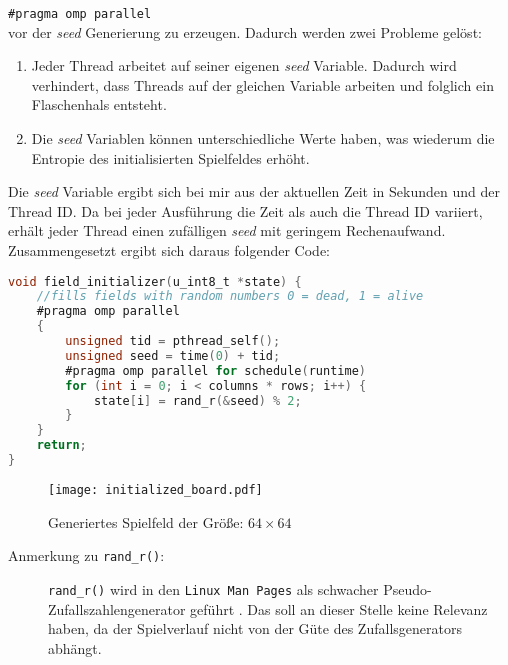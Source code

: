 \documentclass[german,plainarticle,hyperref,utf8]{zihpub}
\begin{document}
	\texttt{\#pragma omp parallel}\\
	
	vor der \textit{seed} Generierung zu erzeugen. Dadurch werden zwei Probleme gelöst:
	\begin{enumerate}
		\item Jeder Thread arbeitet auf seiner eigenen \textit{seed} Variable. Dadurch wird verhindert, dass Threads auf der gleichen Variable arbeiten und folglich ein Flaschenhals entsteht.
		\item Die \textit{seed} Variablen können unterschiedliche Werte haben, was wiederum die Entropie des initialisierten Spielfeldes erhöht.
	\end{enumerate}
	
	Die \textit{seed} Variable ergibt sich bei mir aus der aktuellen Zeit in Sekunden und der Thread ID. Da bei jeder Ausführung die Zeit als auch die Thread ID variiert, erhält jeder Thread einen zufälligen \textit{seed} mit geringem Rechenaufwand.\\
	
	Zusammengesetzt ergibt sich daraus folgender Code:\\
	
	\begin{lstlisting}[language=C, caption=Daten Initialisierung]
void field_initializer(u_int8_t *state) {
	//fills fields with random numbers 0 = dead, 1 = alive
	#pragma omp parallel
	{
		unsigned tid = pthread_self();
		unsigned seed = time(0) + tid;
		#pragma omp parallel for schedule(runtime)
		for (int i = 0; i < columns * rows; i++) {
			state[i] = rand_r(&seed) % 2;
		}
	}
	return;
}\end{lstlisting}
	\begin{figure}[h]
		\begin{center}
			\texttt{[image: initialized\_board.pdf]}
		\end{center}
		\caption{Generiertes Spielfeld der Größe: $64\times 64$}
	\end{figure}
	\newpage
	\begin{description}
		\item[Anmerkung zu \texttt{rand\_r()}:] \texttt{rand\_r()} wird in den \texttt{Linux Man Pages} als schwacher Pseudo-Zufallszahlengenerator geführt \cite{lmp}. Das soll an dieser Stelle keine Relevanz haben, da der Spielverlauf nicht von der Güte des Zufallsgenerators abhängt.
	\end{description}
	
\end{document}
